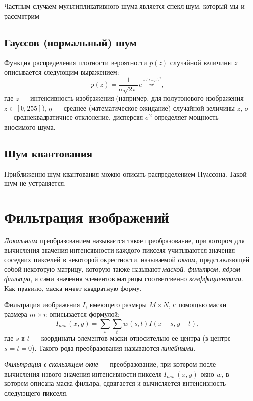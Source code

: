 Частным случаем мультипликативного шума является спекл-шум, который мы и рассмотрим
\subsection{Гауссов (нормальный) шум}
Функция распределения плотности вероятности
$p(z)$ случайной величины $z$ описывается следующим выражением:
\begin{equation}
    p(z)= \frac{1}{\sigma\sqrt{2\pi}}\, e^{\frac{-(z-\mu)^2}{2\sigma^2}},
\end{equation}
где $z$ — интенсивность изображения (например, для полутонового изображения $z \in [0,255]$), $\eta$ — среднее (математическое ожидание) случайной величины $z$, $\sigma$ — среднеквадратичное отклонение, дисперсия $\sigma^2$ определяет мощность вносимого шума.

\subsection{Шум квантования}
Приближенно шум квантования можно описать распределением Пуассона. Такой шум не устраняется.

\section{Фильтрация изображений}
\textit{Локальным} преобразованием называется такое преобразование, при котором для вычисления значения интенсивности каждого пикселя учитываются значения соседних пикселей в некоторой окрестности, называемой \textit{окном}, представляющей собой некоторую матрицу, которую также называют \textit{маской, фильтром, ядром фильтра}, а сами значения элементов
матрицы соответсвенно \textit{коэффициентами}. Как правило, маска имеет квадратную форму.

Фильтрация изображения $I$, имеющего размеры $M \times N$, с помощью маски размера $m \times n$ описывается формулой:
\begin{equation}
    I_{new}(x,y) = \sum_s \sum_t w(s,t) I(x+s,y+t),
\end{equation}
где $s$ и $t$ — координаты элементов маски относительно ее центра (в
центре $s = t = 0$). Такого рода преобразования называются \textit{линейными}.

\textit{Фильтрация в скользящем окне} — преобразование, при котором после вычисления нового значения интенсивности пикселя $I_{new}(x,y)$ окно $w$, в котором описана маска фильтра, сдвигается и
вычисляется интенсивность следующего пикселя.

